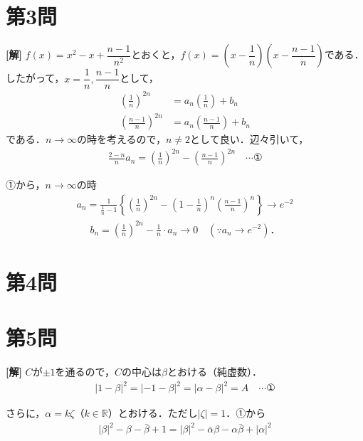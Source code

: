 \documentclass[../main.tex]{subfiles}
\begin{document}
\newpage

\section*{第3問}

{\bf [解]}
$f(x)=x^2-x+\dfrac{n-1}{n^2}$とおくと，$f(x)=\left(x-\dfrac1n\right)\left(x-\dfrac{n-1}n\right)$である．したがって，$x=\dfrac1n,\dfrac{n-1}n$として，
\begin{align*}
  \left(\frac1n\right)^{2n}&=a_n\left(\frac1n\right)+b_n\\
  \left(\frac{n-1}n\right)^{2n}&=a_n\left(\frac{n-1}n\right)+b_n
\end{align*}
である．$n\to\infty$の時を考えるので，$n\ne2$として良い．辺々引いて，
\begin{align*}
  \frac{2-n}na_n=\left(\frac1n\right)^{2n}-\left(\frac{n-1}n\right)^{2n}\quad\cdots①
\end{align*}

①から，$n\to\infty$の時
\begin{align*}
  a_n=\frac1{\frac1n-1}\left\{\left(\frac1n\right)^{2n}-\left(1-\frac1n\right)^n\left(\frac{n-1}n\right)^n\right\}\longrightarrow e^{-2}
\end{align*}
\begin{align*}
  b_n=\left(\frac1n\right)^{2n}-\frac1n\cdot a_n\longrightarrow0\quad(\because a_n\to e^{-2})．
\end{align*}

\newpage

\section*{第4問}

\newpage

\section*{第5問}

{\bf [解]}
$C$が$\pm1$を通るので，$C$の中心は$\beta$とおける（純虚数）．
\begin{align*}
  |1-\beta|^2=|-1-\beta|^2=|\alpha-\beta|^2=A\quad\cdots①
\end{align*}

さらに，$\alpha=k\zeta$（$k\in\mathbb R$）とおける．ただし$|\zeta|=1$．①から
\begin{align*}
  |\beta|^2-\beta-\bar\beta+1=|\beta|^2-\bar\alpha\beta-\alpha\bar\beta+|\alpha|^2
\end{align*}
\end{document}
